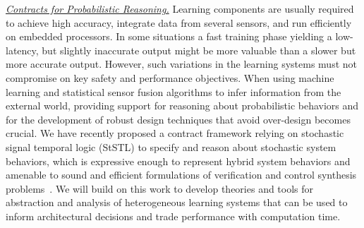 \noindent\underline{\textit{Contracts for Probabilistic Reasoning.}} 
Learning components are usually required to achieve high accuracy, integrate data from several sensors, and run efficiently on embedded processors. 
In some situations a fast training phase yielding a low-latency, but slightly inaccurate output might be more valuable than a slower but more accurate output. However, such variations in the learning systems must not compromise on key safety and performance objectives. When using machine learning and statistical sensor fusion algorithms to infer information from the external world, providing support for reasoning about probabilistic behaviors and for the development of robust design techniques that avoid over-design becomes crucial. 
We have recently proposed a contract framework relying on stochastic signal temporal logic (StSTL) to specify and reason about stochastic system behaviors, which is expressive enough to represent hybrid system behaviors and amenable to sound and efficient formulations of verification and control synthesis problems~\cite{Li17}.  We will build on this work to  develop theories and tools for abstraction and analysis of heterogeneous learning systems that can be used to inform architectural decisions and trade performance with computation time.
%
%
